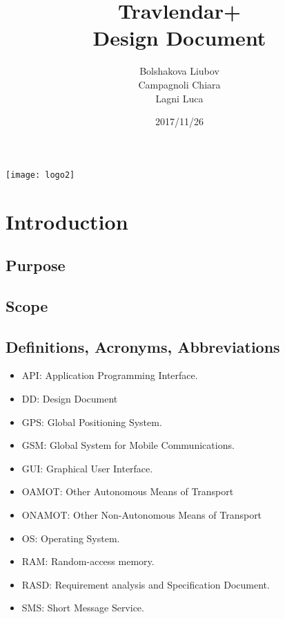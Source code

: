 \documentclass[a4paper,leqno]{article}
\begin{document}
	
	
\date{2017/11/26}
\author{Bolshakova Liubov\\ Campagnoli Chiara\\ Lagni Luca}
\title{\textbf{\huge Travlendar+}\\ Design Document}
\begin{minipage}[!t]{\linewidth}
	\centering
	\texttt{[image: logo2]}
\end{minipage}
\begin{minipage}[!h]{\linewidth}
	\maketitle 
\end{minipage}

\newpage
\tableofcontents                  
  
\newpage	
\section{Introduction}
\subsection{Purpose}
\subsection{Scope}

\subsection{Definitions, Acronyms, Abbreviations}
\begin{itemize}
	\item API: Application Programming Interface.
	\item DD: Design Document
	\item GPS: Global Positioning System.
	\item GSM: Global System for Mobile Communications.
	\item GUI: Graphical User Interface.
	\item OAMOT: Other Autonomous Means of Transport
	\item ONAMOT: Other Non-Autonomous Means of Transport
	\item OS: Operating System.
	\item RAM: Random-access memory.
	\item RASD: Requirement analysis and Specification Document.
	\item SMS: Short Message Service.
\end{itemize}
\end{document}

